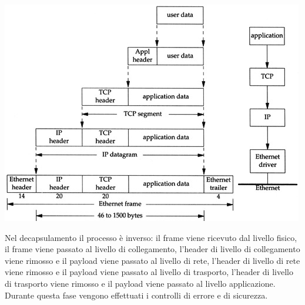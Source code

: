 \documentclass[12pt]{report}
\begin{document}
	\begin{center}
		\includegraphics[scale=0.50]{assets/tcp-encapsulation.jpg} 
	\end{center}
	Nel decapsulamento il processo è inverso: il frame viene ricevuto dal livello fisico, il frame viene passato al livello di collegamento, l'header di livello di collegamento viene rimosso e il payload viene passato al livello di rete, l'header di livello di rete viene rimosso e il payload viene passato al livello di trasporto, l'header di livello di trasporto viene rimosso e il payload viene passato al livello applicazione. Durante questa fase vengono effettuati i controlli di errore e di sicurezza.
\end{document}
